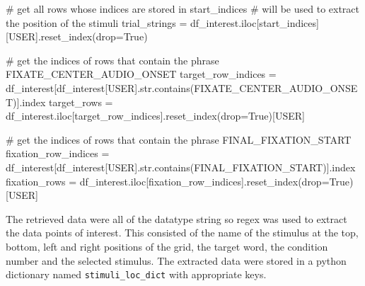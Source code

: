 \documentclass[
  a4paper,
]{article}
\newenvironment{Shaded}{}{}
\newcommand{\BuiltInTok}[1]{\textcolor[rgb]{0.84,0.23,0.29}{#1}}
\newcommand{\CommentTok}[1]{\textcolor[rgb]{0.42,0.45,0.49}{#1}}
\newcommand{\NormalTok}[1]{\textcolor[rgb]{0.14,0.16,0.18}{#1}}
\newcommand{\OperatorTok}[1]{\textcolor[rgb]{0.14,0.16,0.18}{#1}}
\newcommand{\StringTok}[1]{\textcolor[rgb]{0.01,0.18,0.38}{#1}}
\newcommand{\VariableTok}[1]{\textcolor[rgb]{0.89,0.38,0.04}{#1}}
\begin{document}
\begin{Shaded}
\begin{Highlighting}[]
\CommentTok{\# get all rows whose indices are stored in start\_indices}
\CommentTok{\# will be used to extract the position of the stimuli}
\NormalTok{trial\_strings }\OperatorTok{=}\NormalTok{ df\_interest.iloc[start\_indices][}\StringTok{\textquotesingle{}USER\textquotesingle{}}\NormalTok{].reset\_index(drop}\OperatorTok{=}\VariableTok{True}\NormalTok{)}

\CommentTok{\# get the indices of rows that contain the phrase \textquotesingle{}FIXATE\_CENTER\_AUDIO\_ONSET\textquotesingle{}}
\NormalTok{target\_row\_indices }\OperatorTok{=}\NormalTok{ df\_interest[df\_interest[}\StringTok{\textquotesingle{}USER\textquotesingle{}}\NormalTok{].}\BuiltInTok{str}\NormalTok{.contains(}\StringTok{\textquotesingle{}FIXATE\_CENTER\_AUDIO\_ONSET\textquotesingle{}}\NormalTok{)].index}
\NormalTok{target\_rows }\OperatorTok{=}\NormalTok{ df\_interest.iloc[target\_row\_indices].reset\_index(drop}\OperatorTok{=}\VariableTok{True}\NormalTok{)[}\StringTok{\textquotesingle{}USER\textquotesingle{}}\NormalTok{]}

\CommentTok{\# get the indices of rows that contain the phrase \textquotesingle{}FINAL\_FIXATION\_START\textquotesingle{}}
\NormalTok{fixation\_row\_indices }\OperatorTok{=}\NormalTok{ df\_interest[df\_interest[}\StringTok{\textquotesingle{}USER\textquotesingle{}}\NormalTok{].}\BuiltInTok{str}\NormalTok{.contains(}\StringTok{\textquotesingle{}FINAL\_FIXATION\_START\textquotesingle{}}\NormalTok{)].index}
\NormalTok{fixation\_rows }\OperatorTok{=}\NormalTok{ df\_interest.iloc[fixation\_row\_indices].reset\_index(drop}\OperatorTok{=}\VariableTok{True}\NormalTok{)[}\StringTok{\textquotesingle{}USER\textquotesingle{}}\NormalTok{]}
\end{Highlighting}
\end{Shaded}

The retrieved data were all of the datatype string so regex was used to
extract the data points of interest. This consisted of the name of the
stimulus at the top, bottom, left and right positions of the grid, the
target word, the condition number and the selected stimulus. The
extracted data were stored in a python dictionary named
\texttt{stimuli\_loc\_dict} with appropriate keys.
\end{document}
